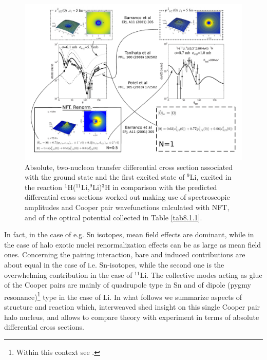   \begin{figure}
  \centerline{\includegraphics*[width=18cm,angle=0]{C8/figsC8/fig8_1_3}}
  	\caption{Absolute, two-nucleon transfer differential cross section associated with the ground state and the first 	excited state of $^9$Li, excited  in the reaction $^1$H($^{11}$Li,$^9$Li)$^3$H \citep{Tanihata:08} in comparison with the predicted differential cross sections \citep{Potel:10} worked out making use of spectroscopic amplitudes and Cooper pair wavefunctions calculated with NFT, and of the optical potential collected in Table \ref{tab8.1.1}.}\label{fig8_1_2}
  \end{figure}
 In fact, in the case of e.g. Sn isotopes, mean field effects are dominant, while in the case of halo exotic nuclei renormalization effects can be as large as mean field ones. Concerning the pairing interaction, bare and induced contributions are about equal in the case of i.e. Sn-isotopes, while the second one is the overwhelming contribution in the case of $^{11}$Li. The collective modes acting as glue of the Cooper pairs are mainly of quadrupole type in Sn and of dipole (pygmy resonance)\footnote{Within this context see \cite{Broglia:19}.} type in the case of Li. In what follows we summarize aspects of structure and reaction which, interweaved shed insight on this single Cooper pair halo nucleus, and allows to compare theory with experiment in terms of absolute differential cross sections.

 
 
 
 
 
 

